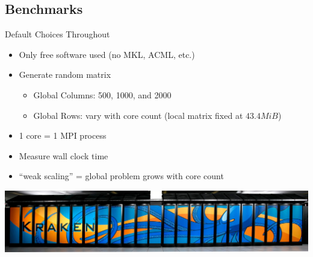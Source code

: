 \subsection{Benchmarks}

\begin{frame}
  \begin{block}{Default Choices Throughout}
    \begin{itemize}[<+-|alert@+>]
      \item Only free software used (no MKL, ACML, etc.)
      \item Generate random matrix
        \begin{itemize}
        \item Global Columns: 500, 1000, and 2000
        \item Global Rows: vary with core count (local matrix fixed at
          $43.4 MiB$)
        \end{itemize}
      \item 1 core = 1 MPI process
      \item Measure wall clock time
      \item ``weak scaling'' = global problem grows with core count
    \end{itemize}
    \vspace{.8cm}
    \centering\includegraphics{../common/pics/krakenWide}
  \end{block}
\end{frame}

